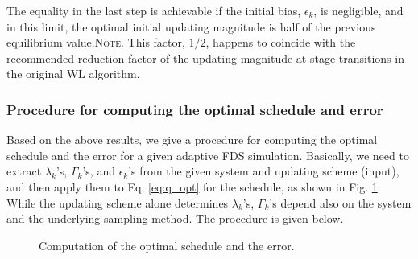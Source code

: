 \documentclass[reprint, superscriptaddress, floatfix]{revtex4-1}
\newcommand{\note}[1]{{\color{DarkGreen}\footnotesize \textsc{Note.} #1}}
\begin{document}
%
%
The equality in the last step is achievable
if the initial bias, $\epsilon_k$, is negligible,
and in this limit, the optimal initial updating magnitude
is half of the previous equilibrium value.\note{This factor, $1/2$,
  happens to coincide with the
  recommended reduction factor of the updating magnitude
  at stage transitions
  in the original WL algorithm\cite{
  wang2001, wang2001pre}.  }%



\subsubsection{\label{sec:procedure}
Procedure for computing the optimal schedule and error
}



Based on the above results,
we give a procedure for computing
the optimal schedule and the error
for a given adaptive FDS simulation.
%
Basically, we need to extract
$\lambda_k$'s, $\Gamma_k$'s, and $\epsilon_k$'s
from the given system and updating scheme (input),
and then apply them to Eq. \eqref{eq:q_opt}
for the schedule,
as shown in Fig. \ref{fig:vardep}.
%
While the updating scheme alone
determines $\lambda_k$'s,
$\Gamma_k$'s depend also on the system
and the underlying sampling method.
%
The procedure is given below.

\begin{figure}[h]\centering
  \caption{
    \label{fig:vardep}
    Computation of the optimal schedule and the error.
  }
\end{figure}
\end{document}
